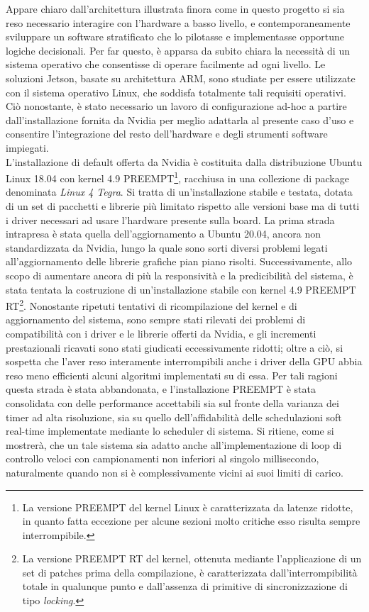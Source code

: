 \indent Appare chiaro dall'architettura illustrata finora come in questo progetto si sia reso necessario interagire con l'hardware a basso livello, e contemporaneamente sviluppare un software stratificato che lo pilotasse e implementasse opportune logiche decisionali. Per far questo, è apparsa da subito chiara la necessità di un sistema operativo che consentisse di operare facilmente ad ogni livello. Le soluzioni Jetson, basate su architettura ARM, sono studiate per essere utilizzate con il sistema operativo Linux, che soddisfa totalmente tali requisiti operativi. Ciò nonostante, è stato necessario un lavoro di configurazione ad-hoc a partire dall'installazione fornita da Nvidia per meglio adattarla al presente caso d'uso e consentire l'integrazione del resto dell'hardware e degli strumenti software impiegati.\\
L'installazione di default offerta da Nvidia è costituita dalla distribuzione Ubuntu Linux 18.04 con kernel 4.9 PREEMPT\footnote{La versione PREEMPT del kernel Linux è caratterizzata da latenze ridotte, in quanto fatta eccezione per alcune sezioni molto critiche esso risulta sempre interrompibile.}, racchiusa in una collezione di package denominata \emph{Linux 4 Tegra}. Si tratta di un'installazione stabile e testata, dotata di un set di pacchetti e librerie più limitato rispetto alle versioni base ma di tutti i driver necessari ad usare l'hardware presente sulla board. La prima strada intrapresa è stata quella dell'aggiornamento a Ubuntu 20.04, ancora non standardizzata da Nvidia, lungo la quale sono sorti diversi problemi legati all'aggiornamento delle librerie grafiche pian piano risolti. Successivamente, allo scopo di aumentare ancora di più la responsività e la predicibilità del sistema, è stata tentata la costruzione di un'installazione stabile con kernel 4.9 PREEMPT RT\footnote{La versione PREEMPT RT del kernel, ottenuta mediante l'applicazione di un set di patches prima della compilazione, è caratterizzata dall'interrompibilità totale in qualunque punto e dall'assenza di primitive di sincronizzazione di tipo \emph{locking}.}. Nonostante ripetuti tentativi di ricompilazione del kernel e di aggiornamento del sistema, sono sempre stati rilevati dei problemi di compatibilità con i driver e le librerie offerti da Nvidia, e gli incrementi prestazionali ricavati sono stati giudicati eccessivamente ridotti; oltre a ciò, si sospetta che l'aver reso interamente interrompibili anche i driver della GPU abbia reso meno efficienti alcuni algoritmi implementati su di essa. Per tali ragioni questa strada è stata abbandonata, e l'installazione PREEMPT è stata consolidata con delle performance accettabili sia sul fronte della varianza dei timer ad alta risoluzione, sia su quello dell'affidabilità delle schedulazioni soft real-time implementate mediante lo scheduler di sistema. Si ritiene, come si mostrerà, che un tale sistema sia adatto anche all'implementazione di loop di controllo veloci con campionamenti non inferiori al singolo millisecondo, naturalmente quando non si è complessivamente vicini ai suoi limiti di carico.\\

